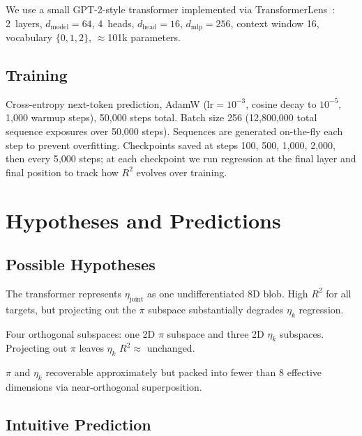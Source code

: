 \documentclass{article}
\begin{document}
We use a small GPT-2-style transformer implemented via TransformerLens~\cite{nanda2022tl}:
2~layers, $d_\mathrm{model}=64$, 4~heads, $d_\mathrm{head}=16$,
$d_\mathrm{mlp}=256$, context window 16, vocabulary $\{0,1,2\}$, $\approx$101k
parameters.

\subsection{Training}

Cross-entropy next-token prediction, AdamW ($\mathrm{lr}=10^{-3}$, cosine
decay to $10^{-5}$, 1{,}000 warmup steps), 50{,}000 steps total.
Batch size 256 (12{,}800{,}000 total sequence exposures over 50{,}000 steps).
Sequences are generated on-the-fly each step to prevent overfitting.
Checkpoints saved at steps 100, 500, 1{,}000, 2{,}000, then every 5{,}000
steps; at each checkpoint we run regression at the final layer and final
position to track how $R^2$ evolves over training.

\section{Hypotheses and Predictions}
\label{sec:predictions}

\subsection{Possible Hypotheses}

\begin{description}[leftmargin=2em]
\item[H1 (Joint):] The transformer represents $\eta_\mathrm{joint}$ as one
  undifferentiated 8D blob. High $R^2$ for all targets, but projecting out
  the $\pi$ subspace substantially degrades $\eta_k$ regression.
\item[H2 (Factored):] Four orthogonal subspaces: one 2D $\pi$ subspace and
  three 2D $\eta_k$ subspaces. Projecting out $\pi$ leaves $\eta_k$
  $R^2 \approx$ unchanged.
\item[H3 (Superposition):] $\pi$ and $\eta_k$ recoverable approximately but
  packed into fewer than 8 effective dimensions via near-orthogonal
  superposition.
\end{description}

\subsection{Intuitive Prediction}
\end{document}
